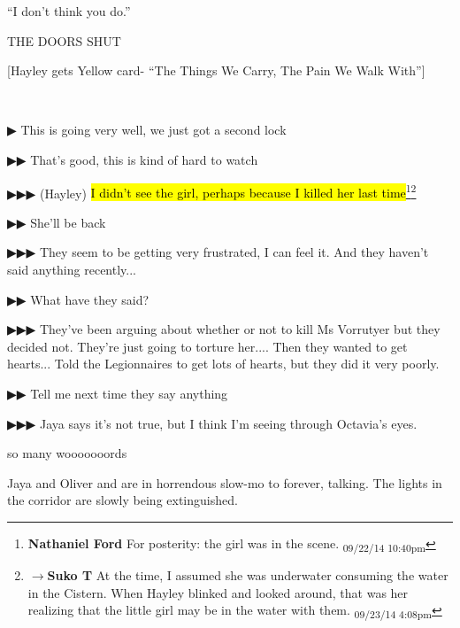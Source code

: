 ``I don't think you do.''

THE DOORS SHUT



{[}Hayley gets Yellow card- ``The Things We Carry, The Pain We Walk With''{]}


{\parskip=0pt
~


 {\color[RGB]{68,68,68}▶}  This is going very well, we just got a second lock

 {\color[RGB]{68,68,68}▶▶}  That's good, this is kind of hard to watch

 {\color[RGB]{68,68,68}▶▶▶ (Hayley) } \hl{I didn't see the girl, perhaps because I killed her last time}\footnote{\textbf{Nathaniel Ford }For posterity: the girl was in the scene. \textsubscript{09/22/14 10:40pm}}\footnote{$\rightarrow$\textbf{Suko T }At the time, I assumed she was underwater consuming the water in the Cistern.  When Hayley blinked and looked around, that was her realizing that the little girl may be in the water with them. \textsubscript{09/23/14 4:08pm}}

 {\color[RGB]{68,68,68}▶▶}  She'll be back

 {\color[RGB]{68,68,68}▶▶▶}  They seem to be getting very frustrated, I can feel it. And they haven't said anything recently...

 {\color[RGB]{68,68,68}▶▶} What have they said?

 {\color[RGB]{68,68,68}▶▶▶} They've been arguing about whether or not to kill Ms Vorrutyer but they decided not. They're just going to torture her.... Then they wanted to get hearts... Told the Legionnaires to get lots of hearts, but they did it very poorly.

 {\color[RGB]{68,68,68}▶▶} Tell me next time they say anything

 {\color[RGB]{68,68,68}▶▶▶} Jaya says it's not true, but I think I'm seeing through Octavia's eyes. 
}

so many wooooooords






Jaya and Oliver and are in horrendous slow-mo to forever, talking.   The lights in the corridor are slowly being extinguished.



